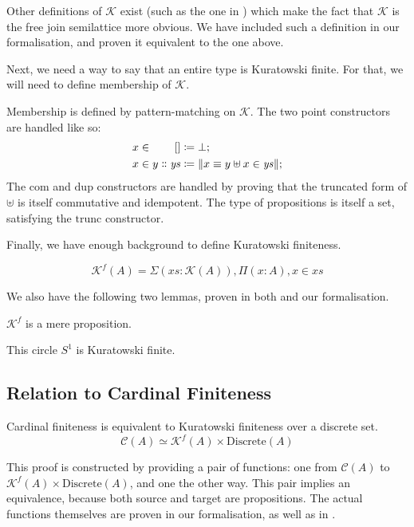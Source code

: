 Other definitions of \(\mathcal{K}\) exist (such as the one in
\cite{fruminFiniteSetsHomotopy2018}) which make the fact that \(\mathcal{K}\) is
the free join semilattice more obvious.
We have included such a definition in our formalisation, and proven it
equivalent to the one above.

Next, we need a way to say that an entire type is Kuratowski finite.
For that, we will need to define membership of \(\mathcal{K}\).
\begin{definition}
  Membership is defined by pattern-matching on \(\mathcal{K}\).
  The two point constructors are handled like so:
  \begin{equation}
    \begin{alignedat}{2}
      x \in&& \; []                      &\coloneqq \bot ; \\
      x \in&& \; y \dblcolon \mathit{ys} &\coloneqq \lVert x \equiv y \uplus x \in \mathit{ys} \rVert ;
    \end{alignedat}
  \end{equation}
  The \(\text{com}\) and \(\text{dup}\) constructors are handled by proving that
  the truncated form of \(\uplus\) is itself commutative and idempotent.
  The type of propositions is itself a set, satisfying the \(\text{trunc}\)
  constructor.
\end{definition}
Finally, we have enough background to define Kuratowski finiteness.
\begin{definition}
  \begin{equation}
    \mathcal{K}^{f}(A) = \Sigma {(\mathit{xs} : \mathcal{K}(A))} , \Pi (x : A) , x \in \mathit{xs}
  \end{equation}
\end{definition}

We also have the following two lemmas, proven in both
\cite{fruminFiniteSetsHomotopy2018} and our formalisation.
\begin{lemma}
  \(\mathcal{K}^f\) is a mere proposition.
\end{lemma}
\begin{lemma}
  This circle \(S^1\) is Kuratowski finite.
\end{lemma}
\subsection{Relation to Cardinal Finiteness}
\begin{lemma} \label{cardinal-kuratowski}
  Cardinal finiteness is equivalent to Kuratowski finiteness over a discrete
  set.
  \begin{equation}
    \mathcal{C}(A) \simeq \mathcal{K}^f(A) \times \text{Discrete}(A)
  \end{equation}
\end{lemma}
This proof is constructed by providing a pair of functions: one from
\(\mathcal{C}(A)\) to \(\mathcal{K}^f(A) \times \text{Discrete}(A)\), and one the
other way.
This pair implies an equivalence, because both source and target are
propositions.
The actual functions themselves are proven in our formalisation, as well as in
\cite{fruminFiniteSetsHomotopy2018}.


